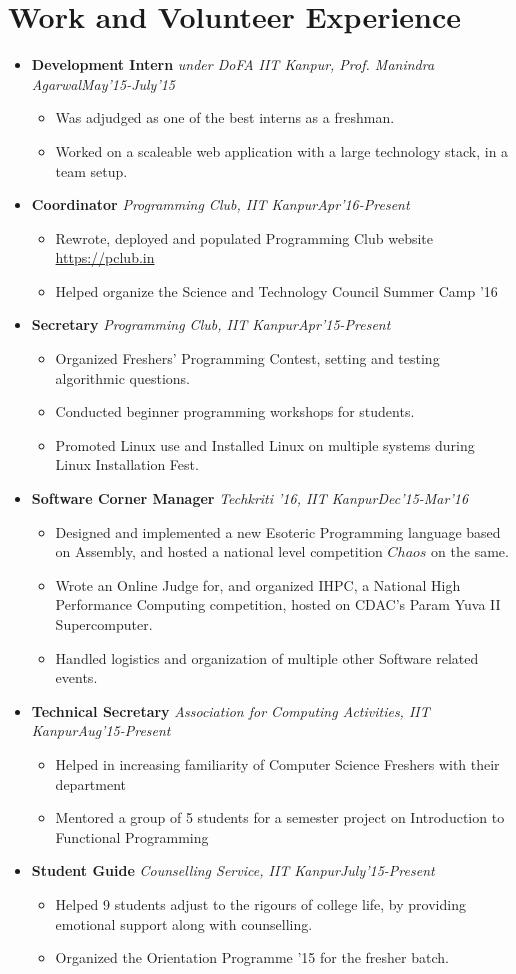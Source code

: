 \documentclass[11pt,a4paper]{moderncv}
\newcommand{\experience}[4]{
  \vspace{0.1cm}
\item \textbf{\large{#1}} \textit{#2}\hfill\textit{#3}
  \begin{itemize}[leftmargin=*]
    \setlength\itemsep{0em} #4
  \end{itemize}
}
\begin{document}
\section*{Work and Volunteer Experience}
\begin{itemize}
  \setlength\itemsep{0.5em}
  \experience{Development Intern}{under DoFA IIT Kanpur, Prof. Manindra Agarwal}{May'15-July'15}{
  \item Was adjudged as one of the best interns as a freshman.
  \item Worked on a scaleable web application with a large technology
    stack, in a team setup.
  }

  \experience{Coordinator}{Programming Club, IIT
    Kanpur}{Apr'16-Present}{
  \item Rewrote, deployed and populated Programming Club website \href{https://pclub.in}{https://pclub.in}
  \item Helped organize the Science and Technology Council Summer Camp
    '16
  }

  \experience{Secretary}{Programming Club, IIT Kanpur}{Apr'15-Present}{
  \item	Organized Freshers’ Programming Contest, setting and testing algorithmic questions.
  \item	Conducted beginner programming workshops for students.
  \item Promoted Linux use and Installed Linux on multiple systems during Linux Installation Fest.
  }

  \experience{Software Corner Manager}{Techkriti '16, IIT
    Kanpur}{Dec'15-Mar'16}{
  \item	Designed and implemented a new Esoteric Programming language
    based on Assembly, and hosted a national level competition $Chaos$
    on the same.
  \item	Wrote an Online Judge for, and organized IHPC, a National High Performance Computing competition, hosted on CDAC’s Param Yuva II Supercomputer.
  \item	Handled logistics and organization of multiple other Software related events.
  }

  \experience{Technical Secretary}{Association for Computing Activities, IIT Kanpur}{Aug'15-Present}{
  \item	Helped in increasing familiarity of Computer Science Freshers with their department
  \item	Mentored a group of 5 students for a semester project on Introduction to Functional Programming
  }

  \experience{Student Guide}{Counselling Service, IIT Kanpur}{July'15-Present}{
  \item Helped 9 students adjust to the rigours of college life, by providing emotional support along with counselling.
  \item Organized the Orientation Programme '15 for the fresher batch.
  }

\end{itemize}
\end{document}
